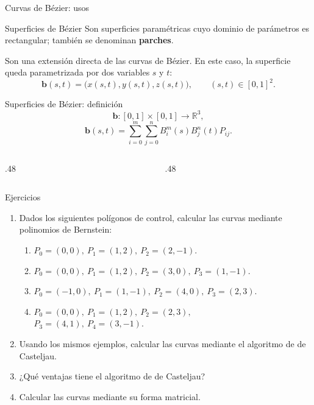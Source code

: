 \documentclass[original_version/main.tex]{subfiles}
\begin{document}
\begin{frame}[t]{Curvas de Bézier: usos}
\end{frame}

\begin{frame}[t]{Superficies de Bézier}
Son superficies paramétricas cuyo dominio de parámetros es rectangular; también se denominan \textbf{parches}.\par\medskip Son una extensión directa de las curvas de Bézier. En este caso, la superficie queda parametrizada por dos variables $s$ y $t$:\[\mathbf b(s,t)=\bigl(x(s,t),y(s,t),z(s,t)\bigr),\qquad (s,t)\in[0,1]^2.\]
\end{frame}

\begin{frame}[t]{Superficies de Bézier: definición}
\small\[\mathbf b:[0,1]\times[0,1]\longrightarrow\mathbb R^3,\]\[\boxed{\mathbf b(s,t)=\sum_{i=0}^{m}\sum_{j=0}^{n}B_i^m(s)B_j^n(t)P_{ij}}.\]\begin{columns}[T]\begin{column}{.48\textwidth}\end{column}\begin{column}{.48\textwidth}\end{column}\end{columns}
\end{frame}

\begin{frame}[t]{Ejercicios}
\small\begin{enumerate}\item Dados los siguientes polígonos de control, calcular las curvas mediante polinomios de Bernstein:\begin{enumerate}\item $P_0=(0,0),\ P_1=(1,2),\ P_2=(2,-1)$.\item $P_0=(0,0),\ P_1=(1,2),\ P_2=(3,0),\ P_3=(1,-1)$.\item $P_0=(-1,0),\ P_1=(1,-1),\ P_2=(4,0),\ P_3=(2,3)$.\item $P_0=(0,0),\ P_1=(1,2),\ P_2=(2,3),$\\$P_3=(4,1),\ P_4=(3,-1)$.\end{enumerate}\item Usando los mismos ejemplos, calcular las curvas mediante el algoritmo de de Casteljau.\item ¿Qué ventajas tiene el algoritmo de de Casteljau?\item Calcular las curvas mediante su forma matricial.\end{enumerate}
\end{frame}
\end{document}
